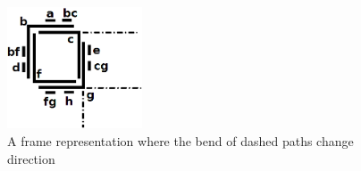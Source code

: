 \begin{figure}[htb]	
\center%
\includegraphics[width=4cm]{./img/outraRepresentacaoFrame.png}
\caption{A frame representation where the bend of dashed paths change direction}
\label{fig:outraRepresentacaoFrame}
\end{figure}